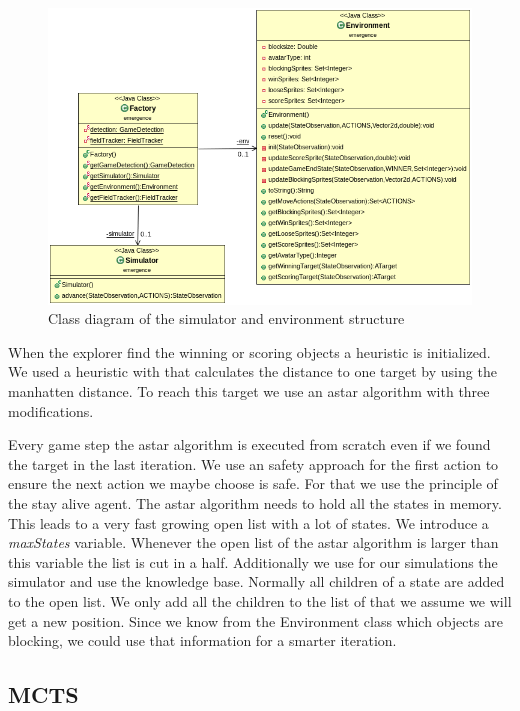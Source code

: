 \begin{figure}
\centering
\includegraphics[scale=0.5]{images/classes.png}
\caption{Class diagram of the simulator and environment structure}
\label{fig:sim_classes}
\end{figure}


When the explorer find the winning or scoring objects a heuristic is initialized. We used a heuristic with that 
calculates the distance to one target by using the manhatten distance. To reach this target we use an astar 
algorithm with three modifications.

Every game step the astar algorithm is executed from scratch even if we found the target in the last iteration.
We use an safety approach for the first action to ensure the next action we maybe choose is safe. For that we
use the principle of the stay alive agent. The astar algorithm needs to hold all the states in memory.
This leads to a very fast growing open list with a lot of states. We introduce a \textit{maxStates} variable. 
Whenever the open list of the astar algorithm is larger than this variable the list is cut in a half.
Additionally we use for our simulations the simulator and use the knowledge base. Normally all children of
a state are added to the open list. We only add all the children to the list of that we assume we will get a 
new position. Since we know from the Environment class which objects are blocking, we could use that information
for a smarter iteration.


\subsection{MCTS} 

